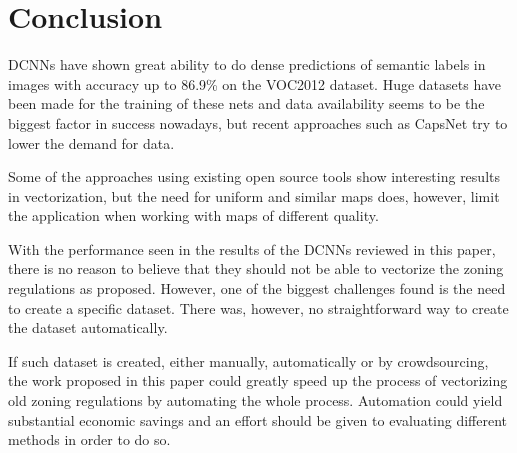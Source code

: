 \chapter{Conclusion}
DCNNs have shown great ability to do dense predictions of semantic labels in images with accuracy up to 86.9\% on the VOC2012 dataset. Huge datasets have been made for the training of these nets and data availability seems to be the biggest factor in success nowadays, but recent approaches such as CapsNet \cite{Sabour2017} try to lower the demand for data.

Some of the approaches using existing open source tools show interesting results in vectorization, but the need for uniform and similar maps does, however, limit the application when working with maps of different quality.

With the performance seen in the results of the DCNNs reviewed in this paper, there is no reason to believe that they should not be able to vectorize the zoning regulations as proposed. However, one of the biggest challenges found is the need to create a specific dataset. There was, however, no straightforward way to create the dataset automatically.

If such dataset is created, either manually, automatically or by crowdsourcing, the work proposed in this paper could greatly speed up the process of vectorizing old zoning regulations by automating the whole process. Automation could yield substantial economic savings and an effort should be given to evaluating different methods in order to do so.